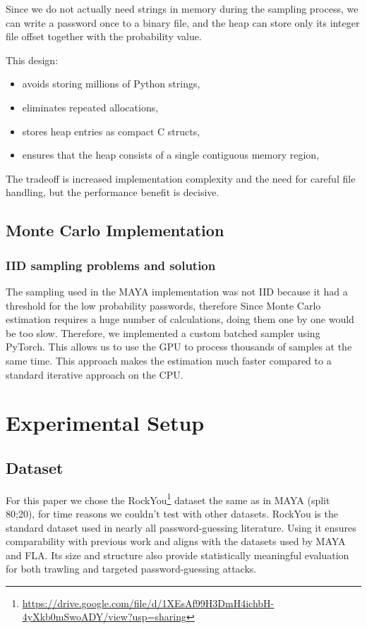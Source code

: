 \documentclass[english,noexaminfo,a4paper,oneside, binding = 0.6cm]{sapthesis}
\begin{document}
Since we do not actually need strings in memory during the sampling process, we can 
write a  password once to a binary file, and the heap
can store only its integer file offset together with the probability value.

This design:
\begin{itemize}
  \item avoids storing millions of Python strings,
  \item eliminates repeated allocations,
  \item stores heap entries as compact C structs,
  \item ensures that the heap consists of a single contiguous memory region,
\end{itemize}

The tradeoff is increased implementation complexity and the need for careful
file handling, but the performance benefit is decisive.
\section{Monte Carlo Implementation}
\subsection{IID sampling problems and solution}
 The sampling used in the MAYA implementation was not IID because it had a threshold for the low probability passwords,
 therefore Since Monte Carlo estimation requires a huge number of calculations, doing them one by one would be too slow. Therefore, we implemented a custom batched sampler using PyTorch. This allows us to use the GPU to process thousands of samples at the same time. This approach makes the estimation much faster compared to a standard iterative approach on the CPU.

\chapter{Experimental Setup}
\label{chap:5}
\section{Dataset}
For this paper we chose the RockYou\footnote{\url{https://drive.google.com/file/d/1XEsAf99H3DmH4ichbH-4yXkb0mSwoADY/view?usp=sharing}} dataset the same as in MAYA \cite{ref:maya}(split 80;20), for time reasons we couldn't test with other datasets.
RockYou is the standard dataset used in nearly all password-guessing literature.
Using it ensures comparability with previous work and aligns with the datasets
used by MAYA and FLA. Its size and structure also provide statistically meaningful
evaluation for both trawling and targeted password-guessing attacks.
\end{document}
